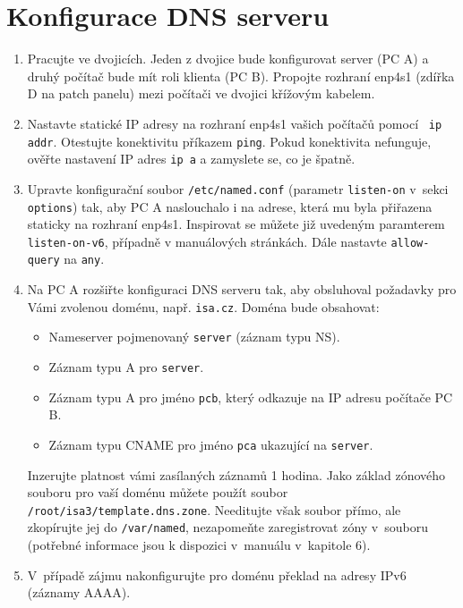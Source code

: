 \section{Konfigurace DNS serveru}
\begin{enumerate}

  \item Pracujte ve dvojicích. Jeden z dvojice bude konfigurovat server (PC A)
    a druhý počítač bude mít roli klienta (PC B). Propojte rozhraní enp4s1 (zdířka
    D na patch panelu) mezi počítači ve dvojici křížovým kabelem.
  \item Nastavte statické IP adresy na rozhraní enp4s1 vašich počítačů pomocí {\tt 
    ip addr}. Otestujte konektivitu příkazem {\tt ping}. Pokud konektivita nefunguje,
    ověřte nastavení IP adres {\tt ip a} a zamyslete se, co je špatně.
  \item Upravte konfigurační soubor {\tt /etc/named.conf} (parametr
    {\tt listen-on} v~sekci {\tt options}) tak, aby
    PC A naslouchalo i na adrese, která mu byla přiřazena staticky na rozhraní enp4s1.
    Inspirovat se můžete již uvedeným paramterem {\tt listen-on-v6}, případně v
    manuálových stránkách. Dále nastavte {\tt allow-query} na {\tt any}.
  \item Na PC A rozšiřte konfiguraci DNS serveru tak, aby obsluhoval požadavky pro Vámi
    zvolenou doménu, např. {\tt isa.cz}. Doména bude obsahovat:
    \begin{itemize}
      \item Nameserver pojmenovaný {\tt server} (záznam typu NS).
      \item Záznam typu A pro {\tt server}.
      \item Záznam typu A pro jméno {\tt pcb}, který odkazuje na IP adresu
        počítače PC B.
      \item Záznam typu CNAME pro jméno {\tt pca} ukazující na {\tt server}.
    \end{itemize}
    Inzerujte platnost vámi zasílaných záznamů 1 hodina.
    Jako základ zónového souboru pro vaší doménu můžete použít soubor 
    {\tt /root/isa3/template.dns.zone}.
    Needitujte však soubor přímo, ale zkopírujte jej do {\tt /var/named}, 
    nezapomeňte zaregistrovat zóny v~souboru  
    (potřebné informace jsou k dispozici v~manuálu v~kapitole 6). 
  \item V~případě zájmu nakonfigurujte pro doménu překlad na adresy IPv6
    (záznamy AAAA).


\end{enumerate}
